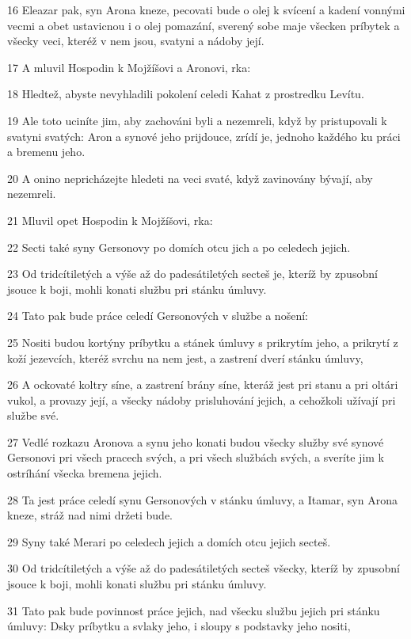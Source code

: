 \par 16 Eleazar pak, syn Arona kneze, pecovati bude o olej k svícení a kadení vonnými vecmi a obet ustavicnou i o olej pomazání, sverený sobe maje všecken príbytek a všecky veci, kteréž v nem jsou, svatyni a nádoby její.
\par 17 A mluvil Hospodin k Mojžíšovi a Aronovi, rka:
\par 18 Hledtež, abyste nevyhladili pokolení celedi Kahat z prostredku Levítu.
\par 19 Ale toto uciníte jim, aby zachováni byli a nezemreli, když by pristupovali k svatyni svatých: Aron a synové jeho prijdouce, zrídí je, jednoho každého ku práci a bremenu jeho.
\par 20 A onino nepricházejte hledeti na veci svaté, když zavinovány bývají, aby nezemreli.
\par 21 Mluvil opet Hospodin k Mojžíšovi, rka:
\par 22 Secti také syny Gersonovy po domích otcu jich a po celedech jejich.
\par 23 Od tridcítiletých a výše až do padesátiletých secteš je, kteríž by zpusobní jsouce k boji, mohli konati službu pri stánku úmluvy.
\par 24 Tato pak bude práce celedí Gersonových v službe a nošení:
\par 25 Nositi budou kortýny príbytku a stánek úmluvy s prikrytím jeho, a prikrytí z koží jezevcích, kteréž svrchu na nem jest, a zastrení dverí stánku úmluvy,
\par 26 A ockovaté koltry síne, a zastrení brány síne, kteráž jest pri stanu a pri oltári vukol, a provazy její, a všecky nádoby prisluhování jejich, a cehožkoli užívají pri službe své.
\par 27 Vedlé rozkazu Aronova a synu jeho konati budou všecky služby své synové Gersonovi pri všech pracech svých, a pri všech službách svých, a sveríte jim k ostríhání všecka bremena jejich.
\par 28 Ta jest práce celedí synu Gersonových v stánku úmluvy, a Itamar, syn Arona kneze, stráž nad nimi držeti bude.
\par 29 Syny také Merari po celedech jejich a domích otcu jejich secteš.
\par 30 Od tridcítiletých a výše až do padesátiletých secteš všecky, kteríž by zpusobní jsouce k boji, mohli konati službu pri stánku úmluvy.
\par 31 Tato pak bude povinnost práce jejich, nad všecku službu jejich pri stánku úmluvy: Dsky príbytku a svlaky jeho, i sloupy s podstavky jeho nositi,
